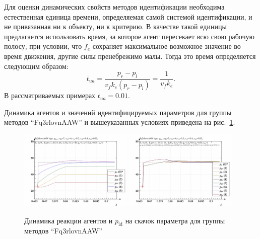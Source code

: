 Для оценки динамических свойств методов идентификации необходима
естественная единица времени, определяемая самой системой идентификации,
и не привязанная ни к объекту, ни к критерию.
В качестве такой единицы предлагается использовать время,
за которое агент пересекает всю свою рабочую полосу,
при условии, что $f_e$ сохраняет максимальное возможное значение
во время движения, другие силы пренебрежимо малы.
Тогда это время определяется следующим образом:
%
\begin{equation}
  t_{ua} = \frac{p_r - p_l}{ v_f k_e (p_r - p_l)} = \frac{1}{v_f k_e}.
  \label{atu:eq:t_ua}
\end{equation}
%
В рассматриваемых примерах $t_{ua} = 0.01$.

Динамика агентов и значений идентифицируемых параметров для
группы методов ``Fq3rlovnAAW''
и вышеуказанных условиях
приведена на рис.~\ref{atu:f:Fq3rlovnAAW_sign}.


\begin{figure}[htb!]
  \centerline{
    \includegraphics[width=0.48\textwidth]{p/sign/qls-p_t_pi_m_Fq3rlovnAAW_sign.png}
    \hfill
    \includegraphics[width=0.48\textwidth]{p/sign/qls-p_t_p_m_Fq3rlovnAAW_sign.png}
  }
  \caption{Динамика реакции агентов и $p_\mathrm{id}$ на скачок параметра для группы методов ``Fq3rlovnAAW''}
  \label{atu:f:Fq3rlovnAAW_sign}
\end{figure}

